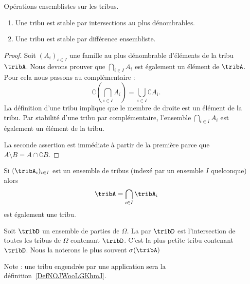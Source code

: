 \begin{lemma}   \label{LemBWNlKfA}
    Opérations ensemblistes sur les tribus.
    \begin{enumerate}
        \item       \label{ITEMooTDXNooFszBzi}
    Une tribu est stable par intersections au plus dénombrables.
\item       \label{ItemXQVLooFGBQNj}
    Une tribu est stable par différence ensembliste.
    \end{enumerate}
\end{lemma}

\begin{proof}
    Soit \( (A_i)_{i\in I}\) une famille au plus dénombrable d'éléments de la tribu \( \tribA\). Nous devons prouver que \( \bigcap_{i\in I}A_i\) est également un élément de \( \tribA\). Pour cela nous passons au complémentaire :
    \begin{equation}
        \complement\left( \bigcap_{i\in I}A_i \right)=\bigcup_{i\in I}\complement A_i.
    \end{equation}
    La définition d'une tribu implique que le membre de droite est un élément de la tribu. Par stabilité d'une tribu par complémentaire, l'ensemble \( \bigcap_{i\in I}A_i\) est également un élément de la tribu.

    La seconde assertion est immédiate à partir de la première parce que \( A\setminus B=A\cap \complement B\).
\end{proof}

Si \( (\tribA_i)_{i\in I}\) est un ensemble de tribus (indexé par un ensemble \( I\) quelconque) alors
\begin{equation}
    \tribA=\bigcap_{i\in I}\tribA_i
\end{equation}
est également une tribu.

\begin{definition}
    Soit \( \tribD\) un ensemble de parties de \( \Omega\). La  par \( \tribD\) est l'intersection de toutes les tribus de \( \Omega\) contenant \( \tribD\). C'est la plus petite tribu contenant \( \tribD\). Nous la noterons le plus souvent \( \sigma(\tribA)\)
\end{definition}

Note : une tribu engendrée par une application sera la définition~\ref{DefNOJWooLGKhmJ}.

